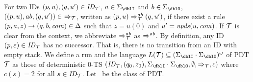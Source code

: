 For two IDs $(p, u), (q, u')\in \mathit{ID}_{\cal T}$,
$a\in\Sigma_\dblI$ and $b\in\Sigma_\dblO$,
$((p, u), ab, (q, u'))\in\ \Rightarrow_\calT$,
written as $(p, u) \Rightarrow_{{\cal T}}^{ab} (q, u')$,
if there exist a rule $(p, a, z) \rightarrow (q, b, \mathit{com}) \in \Delta$
such that $z=u(0)$ and $u'=\mathit{upds}(u,\mathit{com})$.
If ${\cal T}$ is clear from the context,
we abbreviate
$\Rightarrow_{{\cal T}}^{ab}$ as $\Rightarrow^{ab}$.
By definition, any ID $(p, \varepsilon)\in\mathit{ID}_{{\cal T}}$ has
no successor.
That is, there is no transition from an ID with empty stack.
We define a run and the language $L(\calT)\subseteq (\Sigma_\dblI \cdot \Sigma_\dblO)^{\omega}$ of PDT ${\cal T}$ as those of
deterministic $0$-TS $(\ID_\calT, (q_0,z_0), \Sigma_\dblI\cdot\Sigma_\dblO, \emptyset, \Rightarrow_\calT, c)$ where $c(s)=2$ for all $s\in\mathit{ID}_{\cal T}$.
Let \PDT\ be the class of PDT.

